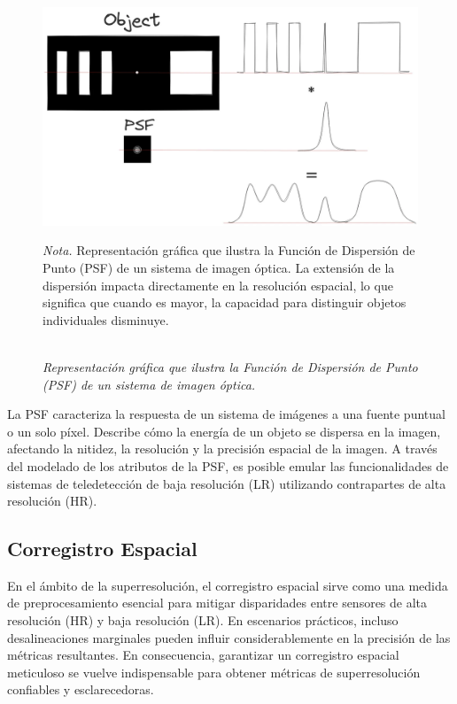 \begin{figure}[H] 
    \caption{\doublespacing \\ \textit{Representación gráfica que ilustra la Función de Dispersión de Punto (PSF) de un sistema de imagen óptica.}} 
    \centering
    \includegraphics[width=1\linewidth]{images/csaybar_new_fig01.png}
    \begin{justify}
        \textit{Nota.} Representación gráfica que ilustra la Función de Dispersión de Punto (PSF) de un sistema de imagen óptica. La extensión de la dispersión impacta directamente en la resolución espacial, lo que significa que cuando es mayor, la capacidad para distinguir objetos individuales disminuye.
    \end{justify}                    
    \label{fig:psf}
\end{figure}

La PSF caracteriza la respuesta de un sistema de imágenes a una fuente puntual o un solo píxel. Describe cómo la energía de un objeto se dispersa en la imagen, afectando la nitidez, la resolución y la precisión espacial de la imagen. A través del modelado de los atributos de la PSF, es posible emular las funcionalidades de sistemas de teledetección de baja resolución (LR) utilizando contrapartes de alta resolución (HR).

\subsection{Corregistro Espacial}

En el ámbito de la superresolución, el corregistro espacial sirve como una medida de preprocesamiento esencial para mitigar disparidades entre sensores de alta resolución (HR) y baja resolución (LR). En escenarios prácticos, incluso desalineaciones marginales pueden influir considerablemente en la precisión de las métricas resultantes. En consecuencia, garantizar un corregistro espacial meticuloso se vuelve indispensable para obtener métricas de superresolución confiables y esclarecedoras.

